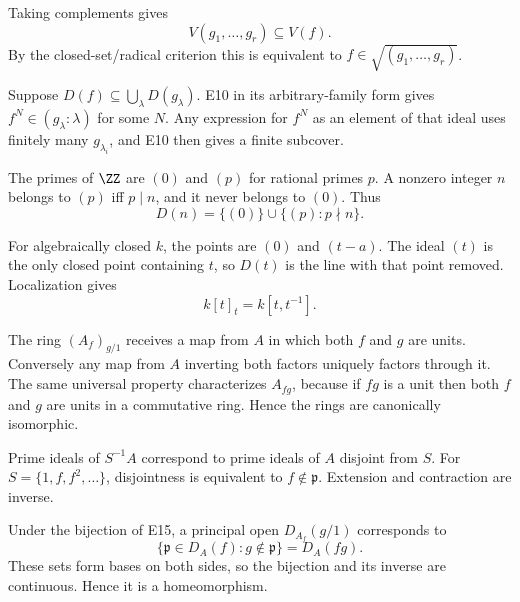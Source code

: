 \begin{solution}[VI.08.E10]
Taking complements gives
\[
V(g_1,\dots,g_r)\subseteq V(f).
\]
By the closed-set/radical criterion this is equivalent to
$f\in\sqrt{(g_1,\dots,g_r)}$.
\end{solution}

\begin{solution}[VI.08.E11]
Suppose $D(f)\subseteq\bigcup_{\lambda}D(g_\lambda)$.  E10 in its arbitrary-family form gives
$f^N\in(g_\lambda:\lambda)$ for some $N$.  Any expression for $f^N$ as an element of that ideal
uses finitely many $g_{\lambda_i}$, and E10 then gives a finite subcover.
\end{solution}

\begin{solution}[VI.08.E12]
The primes of $\ZZ$ are $(0)$ and $(p)$ for rational primes $p$.  A nonzero integer $n$ belongs to
$(p)$ iff $p\mid n$, and it never belongs to $(0)$.  Thus
\[
D(n)=\{(0)\}\cup\{(p):p\nmid n\}.
\]
\end{solution}

\begin{solution}[VI.08.E13]
For algebraically closed $k$, the points are $(0)$ and $(t-a)$.  The ideal $(t)$ is the only closed point
containing $t$, so $D(t)$ is the line with that point removed.  Localization gives
\[
k[t]_t=k[t,t^{-1}].
\]
\end{solution}

\begin{solution}[VI.08.E14]
The ring $(A_f)_{g/1}$ receives a map from $A$ in which both $f$ and $g$ are units.  Conversely any map from
$A$ inverting both factors uniquely factors through it.  The same universal property characterizes $A_{fg}$,
because if $fg$ is a unit then both $f$ and $g$ are units in a commutative ring.  Hence the rings are canonically isomorphic.
\end{solution}

\begin{solution}[VI.08.E15]
Prime ideals of $S^{-1}A$ correspond to prime ideals of $A$ disjoint from $S$.  For
$S=\{1,f,f^2,\dots\}$, disjointness is equivalent to $f\notin\mathfrak p$.  Extension and contraction are inverse.
\end{solution}

\begin{solution}[VI.08.E16]
Under the bijection of E15, a principal open $D_{A_f}(g/1)$ corresponds to
\[
\{\mathfrak p\in D_A(f):g\notin\mathfrak p\}=D_A(fg).
\]
These sets form bases on both sides, so the bijection and its inverse are continuous.  Hence it is a homeomorphism.
\end{solution}

